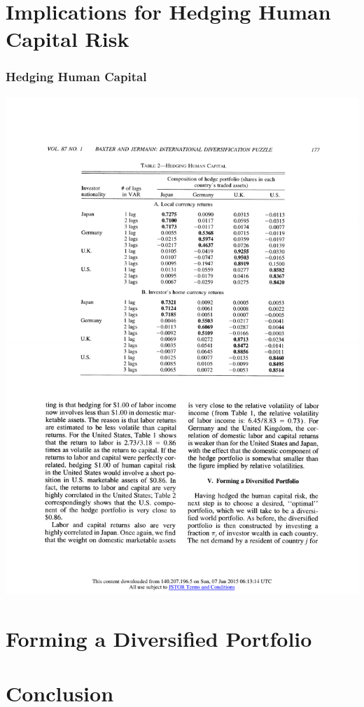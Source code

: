 \documentclass[10pt]{beamer}
\begin{document}
\section[Implications]{Implications for Hedging Human Capital Risk}
\begin{frame}[c]\frametitle{Hedging Human Capital}

\begin{center}
\includegraphics[height=0.85\textheight]{table2.pdf}
\end{center}

\end{frame}

\section[Diversified Portfolio]{Forming a Diversified Portfolio}
\begin{frame}[plain]



\end{frame}
\section{Conclusion}
\begin{frame}[plain]



\end{frame}
\end{document}
